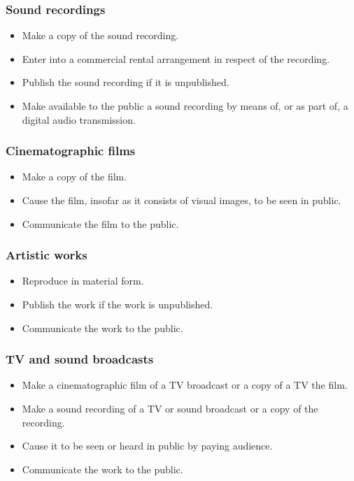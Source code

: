 \documentclass[11pt]{article}
\begin{document}
\subsubsection{Sound recordings}
\label{sec:org5767bec}
\begin{itemize}
\item Make a copy of the sound recording.
\item Enter into a commercial rental arrangement in respect of the recording.
\item Publish the sound recording if it is unpublished.
\item Make available to the public a sound recording by means of, or as part of, a digital audio transmission.
\end{itemize}

\subsubsection{Cinematographic films}
\label{sec:org2c4823f}
\begin{itemize}
\item Make a copy of the film.
\item Cause the film, insofar as it consists of visual images, to be seen in public.
\item Communicate the film to the public.
\end{itemize}

\subsubsection{Artistic works}
\label{sec:org322d4e2}
\begin{itemize}
\item Reproduce in material form.
\item Publish the work if the work is unpublished.
\item Communicate the work to the public.
\end{itemize}

\subsubsection{TV and sound broadcasts}
\label{sec:orgae9eba1}
\begin{itemize}
\item Make a cinematographic film of a TV broadcast or a copy of a TV the film.
\item Make a sound recording of a TV or sound broadcast or a copy of the recording.
\item Cause it to be seen or heard in public by paying audience.
\item Communicate the work to the public.
\end{itemize}
\end{document}
